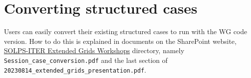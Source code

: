 \section{Converting structured cases}

Users can easily convert their existing structured cases to run with the WG code version. How to do this is explained in documents on the \SOLPSITER SharePoint website, \href{https://sharepoint.iter.org/departments/POP/CM/IMAS/SOLPS-ITER/SOLPS-ITER\%20Extended\%20Grids\%20Workshops}{SOLPS-ITER Extended Grids Workshops} directory, namely {\tt Session\_case\_conversion.pdf} and the last section of {\tt 20230814\_extended\_grids\_presentation.pdf}.
